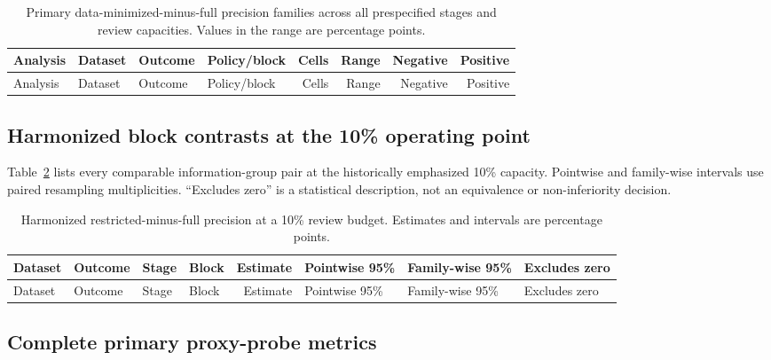 \documentclass[education,supfile,submit,moreauthors]{Definitions/mdpi}
\begin{document}
\scriptsize
\setlength{\tabcolsep}{2pt}
\begin{longtable}{p{}p{}p{}p{}rrrr}
\caption{Primary data-minimized-minus-full precision families across all prespecified stages and review capacities. Values in the range are percentage points.}\label{tab:s_c14families}\\
\toprule
Analysis & Dataset & Outcome & Policy/block & Cells & Range & Negative & Positive \\
\midrule
\endfirsthead
\toprule
Analysis & Dataset & Outcome & Policy/block & Cells & Range & Negative & Positive \\
\midrule
\endhead

\end{longtable}
\setlength{\tabcolsep}{6pt}
\normalsize

\subsection{Harmonized block contrasts at the 10\% operating point}

Table~\ref{tab:s_c14harm10} lists every comparable information-group pair at the historically emphasized 10\% capacity. Pointwise and family-wise intervals use paired resampling multiplicities. ``Excludes zero'' is a statistical description, not an equivalence or non-inferiority decision.

\tiny
\setlength{\tabcolsep}{1.5pt}
\begin{longtable}{p{}p{}p{}p{}rp{}p{}l}
\caption{Harmonized restricted-minus-full precision at a 10\% review budget. Estimates and intervals are percentage points.}\label{tab:s_c14harm10}\\
\toprule
Dataset & Outcome & Stage & Block & Estimate & Pointwise 95\% & Family-wise 95\% & Excludes zero \\
\midrule
\endfirsthead
\toprule
Dataset & Outcome & Stage & Block & Estimate & Pointwise 95\% & Family-wise 95\% & Excludes zero \\
\midrule
\endhead

\end{longtable}
\setlength{\tabcolsep}{6pt}
\normalsize

\subsection{Complete primary proxy-probe metrics}
\end{document}
